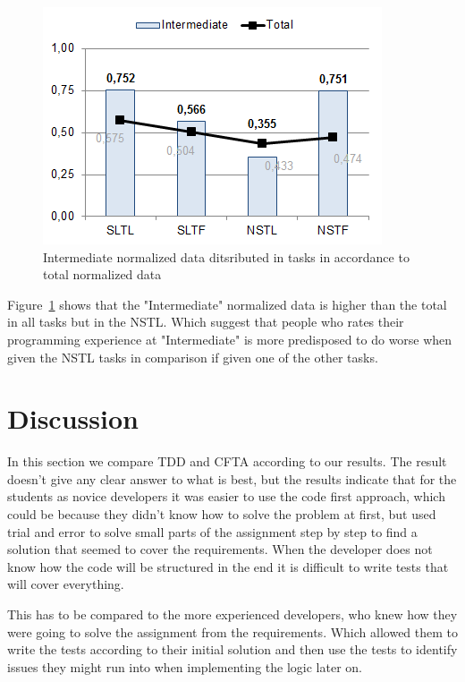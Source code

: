 \documentclass{sig-alternate-05-2015}
\begin{document}
\begin{figure}[!ht]
	\centering
	\includegraphics[width=1\linewidth]{img12}
	\caption{Intermediate normalized data ditsributed in tasks in accordance to total normalized data}
	\label{fig:Intermediate normalized data ditsributed in tasks in accordance to total normalized data}
\end{figure}

Figure~\ref{fig:Intermediate normalized data ditsributed in tasks in accordance to total normalized data} shows that the "Intermediate" normalized data is higher than the total in all tasks but in the NSTL. Which suggest that people who rates their programming experience at "Intermediate" is more predisposed to do worse when given the NSTL tasks in comparison if given one of the other tasks.


\section{Discussion}
In this section we compare TDD and CFTA according to our results. The result doesn't give any clear answer to what is best, but the results indicate that for the students as novice developers it was easier to use the code first approach, which could be because they didn't know how to solve the problem at first, but used trial and error to solve small parts of the assignment step by step to find a solution that seemed to cover the requirements. When the developer does not know how the code will be structured in the end it is difficult to write tests that will cover everything.

This has to be compared to the more experienced developers, who knew how they were going to solve the assignment from the requirements. Which allowed them to write the tests according to their initial solution and then use the tests to identify issues they might run into when implementing the logic later on.
\end{document}
